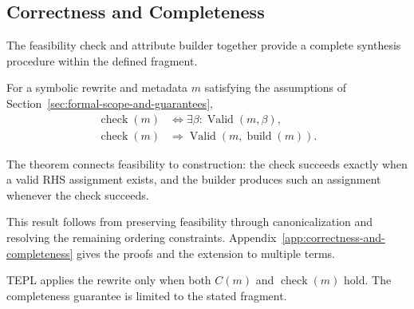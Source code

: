 \subsection{Correctness and Completeness}
\label{sec:correctness-and-completeness}
The feasibility check and attribute builder together provide a complete
synthesis procedure within the defined fragment.

\begin{theorem}
\label{thm:complete-synthesis}
For a symbolic rewrite and metadata $m$ satisfying the assumptions of
Section~\ref{sec:formal-scope-and-guarantees},
\begin{align}
 \operatorname{check}(m)&\iff\exists\beta:\operatorname{Valid}(m,\beta),
 \label{eq:complete-theorem}\\
 \operatorname{check}(m)&\Rightarrow
 \operatorname{Valid}(m,\operatorname{build}(m)).
 \label{eq:sound-theorem}
\end{align}
\end{theorem}
The theorem connects feasibility to construction: the check succeeds
exactly when a valid RHS assignment exists, and the builder produces
such an assignment whenever the check succeeds.

This result follows from preserving feasibility through canonicalization
and resolving the remaining ordering constraints.
Appendix~\ref{app:correctness-and-completeness} gives the proofs and the
extension to multiple terms.

TEPL applies the rewrite only when both $C(m)$ and $\operatorname{check}(m)$
hold. The completeness guarantee is limited to the stated fragment.
